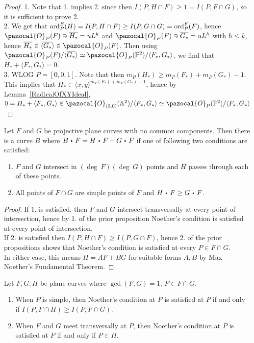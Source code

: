     \begin{proof}
        1. Note that 1. implies 2. since then $I(P,H\cap F)\geq 1 = I(P,F\cap G)$, so it is sufficient to prove 2.\\
        2. We get that $\mathrm{ord}^F_P(H)=I(P,H\cap F)\geq I(P,G\cap G)=\mathrm{ord}^F_P(F)$, hence $\pazocal{O}_P(F)\ni \overline{H_\ast} = uL^k$ and $\pazocal{O}_P(F)\ni \overline{G_\ast} = uL^h$ with $h\leq k$, hence $\overline{H_\ast}\in \langle \overline{G_\ast}\rangle \in \pazocal{O}_P(F)$. Then using $\pazocal{O}_P(F)/\langle \overline{G_\ast}\rangle\simeq \pazocal{O}_P(\Pp^2)/\langle F_\ast,G_\ast\rangle$, we find that $H_\ast+\langle F_\ast,G_\ast\rangle =0$.\\
        3. WLOG $P=[0,0,1]$. Note that then $m_P(H_\ast)\geq m_P(F_\ast)+m_P(G_\ast)-1$. This implies that $H_\ast \in \langle x,y\rangle^{m_P(F_\ast)+m_P(G_\ast)-1}$, hence by Lemma~\ref{RadicalOfXYIdeal}, $0=H_\ast+\langle F_\ast,G_\ast\rangle \in \pazocal{O}_{(0,0)}(\A^2)/\langle F_\ast,G_\ast\rangle \simeq \pazocal{O}_P(\Pp^2)/\langle F_\ast,G_\ast\rangle$
    \end{proof}
    \begin{corollary}\label{ExistenceOfSmallerSubCycle}
        Let $F$ and $G$ be projective plane curves with no common components. Then there is a curve $B$ where $B\ic F = H\ic F-G\ic F$ if one of following two conditions are satisfied:
        \begin{enumerate}
            \item $F$ and $G$ intersect in $(\deg \ F)(\deg\ G)$ points and $H$ passes through each of these points.
            \item All points of $F\cap G$ are simple points of $F$ and $H\ic F\geq G\ic F$.
        \end{enumerate}
    \end{corollary}
    \begin{proof}
        If 1. is satisfied, then $F$ and $G$ intersect transversally at every point of intersection, hence by 1. of the prior proposition Noether's condition is satisfied at every point of intersection.\\
        If 2. is satisfied then $I(P,H\cap F)\geq I(P,G\cap F)$, hence 2. of the prior propositions shows that Noether's condition is satisfied at every $P\in F\cap G$.\\
        In either case, this means $H=AF+BG$ for suitable forms $A,B$ by Max Noether's Fundamental Theorem.
    \end{proof}
    \begin{proposition}
        Let $F,G,H$ be plane curves where $\gcd(F,G)=1$, $P\in F\cap G$.
        \begin{enumerate}
            \item When $P$ is simple, then Noether's condition at $P$ is satisfied at $P$ if and only if $I(P,F\cap H)\geq I(P,F\cap G)$.
            \item When $F$ and $G$ meet transversally at $P$, then Noether's condition at $P$ is satisfied at $P$ if and only if $P\in H$. 
        \end{enumerate}
    \end{proposition}
